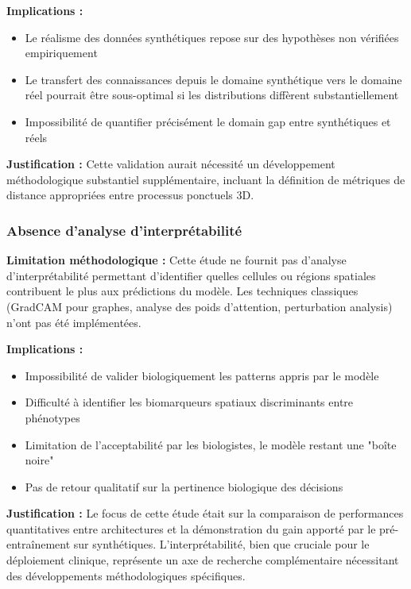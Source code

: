 \textbf{Implications :}
\begin{itemize}
    \item Le réalisme des données synthétiques repose sur des hypothèses non vérifiées empiriquement
    \item Le transfert des connaissances depuis le domaine synthétique vers le domaine réel pourrait être sous-optimal si les distributions diffèrent substantiellement
    \item Impossibilité de quantifier précisément le domain gap entre synthétiques et réels
\end{itemize}

\textbf{Justification :}
Cette validation aurait nécessité un développement méthodologique substantiel supplémentaire, incluant la définition de métriques de distance appropriées entre processus ponctuels 3D.

\subsubsection{Absence d'analyse d'interprétabilité}

\textbf{Limitation méthodologique :}
Cette étude ne fournit pas d'analyse d'interprétabilité permettant d'identifier quelles cellules ou régions spatiales contribuent le plus aux prédictions du modèle. Les techniques classiques (GradCAM pour graphes, analyse des poids d'attention, perturbation analysis) n'ont pas été implémentées.

\textbf{Implications :}
\begin{itemize}
    \item Impossibilité de valider biologiquement les patterns appris par le modèle
    \item Difficulté à identifier les biomarqueurs spatiaux discriminants entre phénotypes
    \item Limitation de l'acceptabilité par les biologistes, le modèle restant une "boîte noire"
    \item Pas de retour qualitatif sur la pertinence biologique des décisions
\end{itemize}

\textbf{Justification :}
Le focus de cette étude était sur la comparaison de performances quantitatives entre architectures et la démonstration du gain apporté par le pré-entraînement sur synthétiques. L'interprétabilité, bien que cruciale pour le déploiement clinique, représente un axe de recherche complémentaire nécessitant des développements méthodologiques spécifiques.

